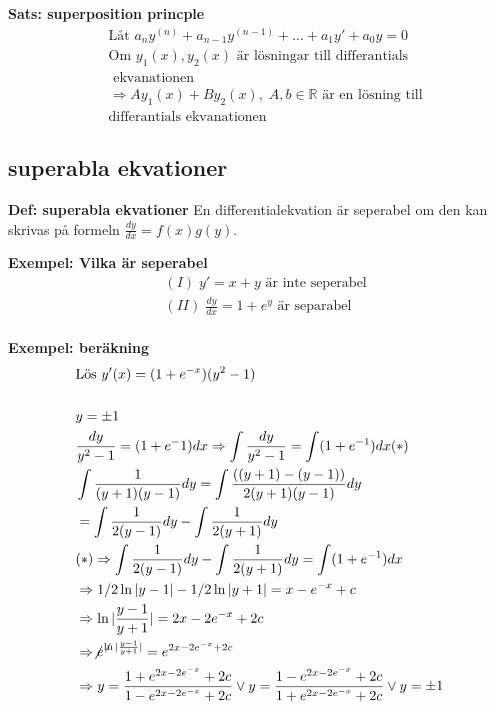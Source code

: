 \begin{multicols}{2}

\textbf{Sats: superposition princple}
\begin{align*}
  &\text{Låt } a_{n}y^{(n)} + a_{n-1}y^{(n-1)} + \ldots + a_{1}y' + a_{0}y = 0  \\
  &\text{Om } y_1(x), y_2(x) \text{ är lösningar till differantials} \\
  &\text{ ekvanationen} \\
  &\Rightarrow Ay_1(x) + By_2(x), \; A,b \in \mathbb{R} \text{ är en lösning till} \\
  &\text{differantials ekvanationen}
\end{align*}


\subsection{superabla ekvationer}
\textbf{Def: superabla ekvationer}
En differentialekvation är seperabel om den kan skrivas på formeln
$\frac{dy}{dx} = f(x)g(y)$.

\textbf{Exempel: Vilka är seperabel}
\begin{align*}
  &(I) \; y'=x+y \text{ är inte seperabel}  \\
  &(II) \; \frac{dy}{dx} = 1 + e^y \text{ är separabel} \\ 
\end{align*}

\textbf{Exempel: beräkning}  
\begin{align*}
  &\text{Lös } y'(x)=(1+e^{-x})(y^2-1) \\
  &\\
  &y=\pm1 \\
  &\frac{dy}{y^2-1}=(1+e^-1)dx  \Rightarrow \int \frac{dy}{y^2-1}= \int (1+e^{-1})dx (*)\\
  &\int \frac{1}{(y+1)(y-1)}dy = \int \frac{((y+1)-(y-1))}{2(y+1)(y-1)}dy \\
  &= \int \frac{1}{2(y-1)}dy - \int \frac{1}{2(y+1)}dy \\
  &(*) \Rightarrow  \int \frac{1}{2(y-1)}dy - \int \frac{1}{2(y+1)}dy = \int (1+e^{-1})dx \\
  &\Rightarrow 1/2 \ln|y-1| - 1/2 \ln|y+1| = x-e^{-x} +c \\
  &\Rightarrow \ln|\frac{y-1}{y+1}| = 2x-2e^{-x}+2c \\
  &\Rightarrow \not{e}^{\not\ln|\frac{y-1}{y+1}|} = e^{2x-2e^{-x}+2c} \\
  &\Rightarrow y = \frac{1+e^{2x-2e^{-x}}+2c}{{1-e^{2x-2e^{-x}}+2c}} \lor
  y=\frac{1-e^{2x-2e^{-x}}+2c}{{1+e^{2x-2e^{-x}}+2c}} \lor y=\pm1
\end{align*}



\end{multicols}

